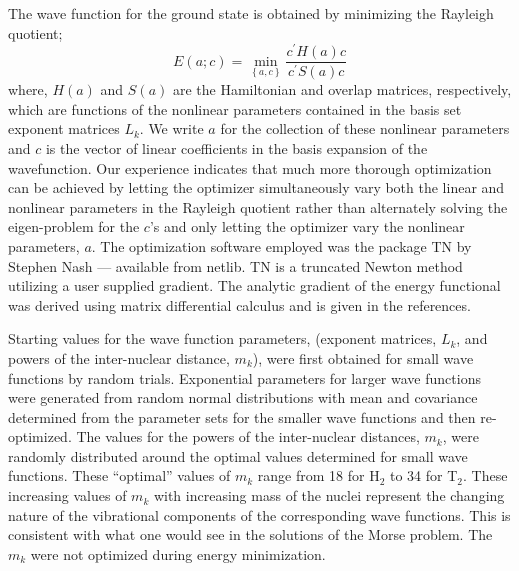 The wave function for the ground state is obtained by minimizing
the Rayleigh quotient; 
\begin{equation}
E\left( a;c\right) =\min_{\left\{ a,c\right\} }\frac{c^{\prime }H(a)c}{
c^{\prime }S(a)c}  \label{energy}
\end{equation}
where, $H\left( a\right) $ and $S\left( a\right) $ are the Hamiltonian
and overlap matrices, respectively, which are functions of the
nonlinear parameters contained in the basis set exponent matrices
$L_k$. We write $a$ for the collection of these nonlinear parameters
and $c$ is the vector of linear coefficients in the basis expansion of
the wavefunction.  Our experience indicates that much more thorough
optimization can be achieved by letting the optimizer simultaneously
vary both the linear and nonlinear parameters in the Rayleigh quotient
rather than alternately solving the eigen-problem for the $c$'s and
only letting the optimizer vary the nonlinear parameters, $a$.  The
optimization software employed was the package TN by Stephen Nash\cite
{NashTN} --- available from netlib\cite{netlib}. TN is a truncated
Newton method utilizing a user supplied gradient. The analytic
gradient of the energy functional was derived using matrix
differential calculus\cite{Kinghorn95a,Kinghorn95b} and is given in
the references\cite{Kinghorn99a}.

Starting values for the wave function parameters, (exponent matrices,
$L_k$, and powers of the inter-nuclear distance, $m_k$), were first
obtained for small wave functions by random trials. Exponential
parameters for larger wave functions were generated from random normal
distributions with mean and covariance determined from the parameter
sets for the smaller wave functions and then re-optimized.  The values
for the powers of the inter-nuclear distances, $m_k$, were randomly
distributed around the optimal values determined for small wave
functions.  These ``optimal'' values of $m_k$ range from 18 for H$_2$
to 34 for T$_2$. These increasing values of $m_k$ with increasing
mass of the nuclei represent the changing nature of the vibrational
components of the corresponding wave functions. This is consistent
with what one would see in the solutions of the Morse problem.  The
$m_k$ were not optimized during energy minimization.


